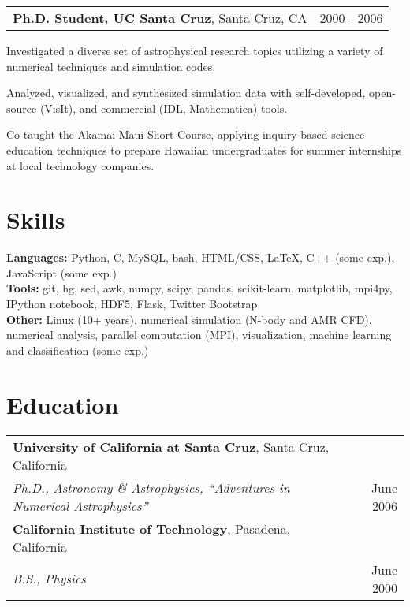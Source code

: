 \begin{resume}
\vspace*{-0.05in}
\hspace*{-0.1in}
\begin{tabularx}{1.025\textwidth}{Xr}
\textbf{Ph.D. Student, UC Santa Cruz}, Santa Cruz, CA & 2000 - 2006
\end{tabularx}
\vspace*{-0.1in}
\begin{list1}
\item Investigated a diverse set of astrophysical research topics utilizing a variety of numerical techniques and simulation codes.
\item Analyzed, visualized, and synthesized simulation data with self-developed, open-source (VisIt), and commercial (IDL, Mathematica) tools.
\item Co-taught the Akamai Maui Short Course, applying inquiry-based science education techniques to prepare Hawaiian undergraduates for summer internships at local technology companies.
\end{list1}



\section{\sc Skills}
\textbf{Languages:} Python, C, MySQL, bash, HTML/CSS, \LaTeX, C++ (some exp.), JavaScript (some exp.) \vspace{0.05in} \\
\textbf{Tools:} git, hg, sed, awk, numpy, scipy, pandas, scikit-learn, matplotlib, mpi4py, IPython notebook, HDF5, Flask, Twitter Bootstrap \vspace{0.05in} \\
\textbf{Other:} Linux (10+ years), numerical simulation (N-body and AMR CFD), numerical analysis, parallel computation (MPI), visualization, machine learning and classification (some exp.) 

\section{\sc Education}
\hspace*{-0.1in}
\begin{tabularx}{1.025\textwidth}{Xr}
\textbf{University of California at Santa Cruz}, Santa Cruz, California & \\
\hspace{0.25in} \textit{Ph.D., Astronomy \& Astrophysics, ``Adventures in Numerical Astrophysics''} & June 2006 \\[0.1in]
\textbf{California Institute of Technology}, Pasadena, California & \\
\hspace{0.25in} \textit{B.S., Physics} & June 2000 \\
\end{tabularx}


\end{resume}

